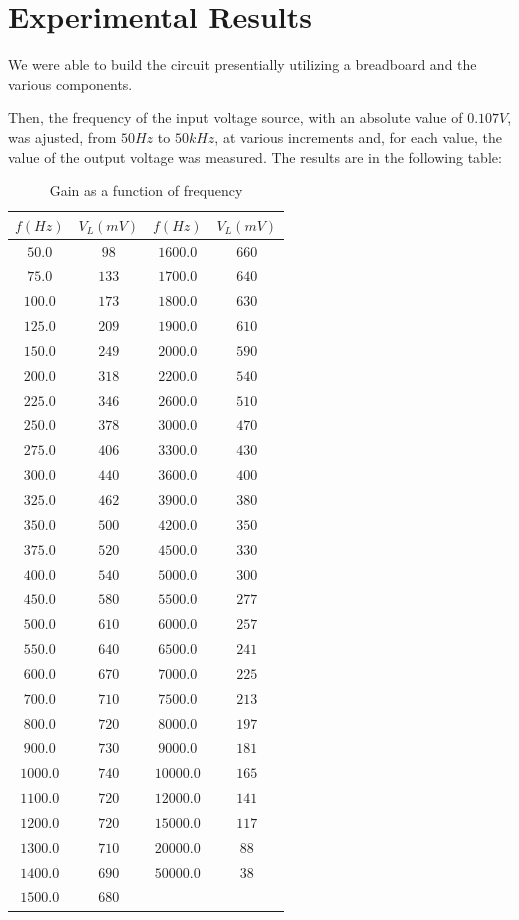 \section{Experimental Results}
\label{sec:lab}

We were able to build the circuit presentially utilizing a breadboard and the various components.

Then, the frequency of the input voltage source, with an absolute value of $0.107 V$, was ajusted, from $50 Hz$ to $50 kHz$, at various increments and, for each value, the value of the output voltage was measured.
The results are in the following table:

\begin{table}
    \caption{Gain as a function of frequency}
    \vspace{-3mm}
    \begin{tabular}{|c|c|c|c|}
    \hline
    $f(Hz)$ &  $V_L(mV)$ & $f(Hz)$ &  $V_L(mV)$\\
    \hline 
    $50.0$  &   $98$  & $1600.0$ &  $660$\\
    $75.0$  &   $133$ & $1700.0$ &  $640$\\
    $100.0$ &  $173$  & $1800.0$ &  $630$\\
    $125.0$ &  $209$  & $1900.0$ &  $610$\\
    $150.0$ &  $249$  & $2000.0$ &  $590$\\
    $200.0$ &  $318$  & $2200.0$ &  $540$\\
    $225.0$ &  $346$  & $2600.0$ &  $510$\\
    $250.0$ &  $378$  & $3000.0$ &  $470$\\
    $275.0$ &  $406$  & $3300.0$ &  $430$\\
    $300.0$ &  $440$  & $3600.0$ &  $400$\\
    $325.0$ &  $462$  & $3900.0$ &  $380$\\
    $350.0$ &  $500$  & $4200.0$ &  $350$\\
    $375.0$ &  $520$  & $4500.0$ &  $330$\\
    $400.0$ &  $540$  & $5000.0$ &  $300$\\
    $450.0$ &  $580$  & $5500.0$ &  $277$\\
    $500.0$ &  $610$  & $6000.0$ &  $257$\\
    $550.0$ &  $640$  & $6500.0$ &  $241$\\
    $600.0$ &  $670$  & $7000.0$ &  $225$\\
    $700.0$ &  $710$  & $7500.0$ &  $213$\\
    $800.0$ &  $720$  & $8000.0$ &  $197$\\
    $900.0$ &  $730$  & $9000.0$ &  $181$\\
    $1000.0$ &  $740$ & $10000.0$&  $165$\\
    $1100.0$ &  $720$ & $12000.0$&  $141$\\
    $1200.0$ &  $720$ & $15000.0$&  $117$\\
    $1300.0$ &  $710$ & $20000.0$ &  $88$\\
    $1400.0$ &  $690$ & $50000.0$ &  $38$\\
    $1500.0$ &  $680$ & &\\


\end{tabular}
\end{table}

